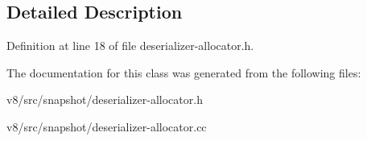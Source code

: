 \subsection{Detailed Description}


Definition at line 18 of file deserializer-\/allocator.\+h.



The documentation for this class was generated from the following files\+:\begin{DoxyCompactItemize}
\item 
v8/src/snapshot/deserializer-\/allocator.\+h\item 
v8/src/snapshot/deserializer-\/allocator.\+cc\end{DoxyCompactItemize}
